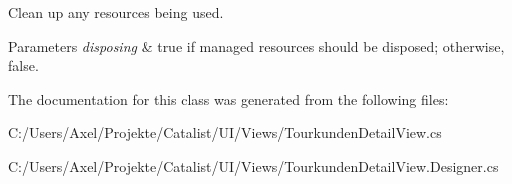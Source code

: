 Clean up any resources being used. 


\begin{DoxyParams}{Parameters}
{\em disposing} & true if managed resources should be disposed; otherwise, false.\\
\hline
\end{DoxyParams}


The documentation for this class was generated from the following files\+:\begin{DoxyCompactItemize}
\item 
C\+:/\+Users/\+Axel/\+Projekte/\+Catalist/\+U\+I/\+Views/Tourkunden\+Detail\+View.\+cs\item 
C\+:/\+Users/\+Axel/\+Projekte/\+Catalist/\+U\+I/\+Views/Tourkunden\+Detail\+View.\+Designer.\+cs\end{DoxyCompactItemize}
